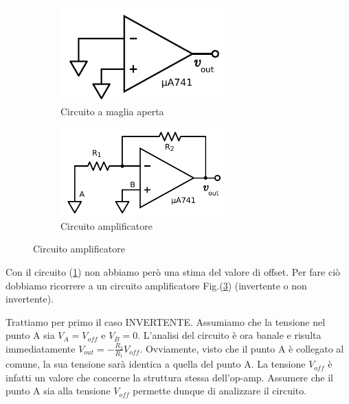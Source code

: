 \begin{figure}[ht]
        \centering
        \begin{subfigure}[b]{0.35\textwidth}
                 \includegraphics[width=0.70\textwidth]{../E02/latex/open_loop.pdf}
                \caption{Circuito a maglia aperta}
                \label{cir:open_loop}
        \end{subfigure}%
    \quad
        \begin{subfigure}[b]{0.35\textwidth}
               \includegraphics[width=0.70\textwidth]{../E02/latex/inv.pdf}
                \caption{Circuito amplificatore}
                \label{cir:inv}
        \end{subfigure}
     
\end{figure}





Con il circuito (\ref{cir:open_loop}) non abbiamo però una stima del valore di offset. Per fare ciò dobbiamo ricorrere a un circuito amplificatore Fig.(\ref{cir:inv}) (invertente o non invertente).




Trattiamo per primo il caso INVERTENTE. Assumiamo che la tensione nel punto A sia $V_A=V_{off}$ e $V_B=0$. L'analisi del circuito è ora banale e risulta immediatamente $V_{out}=-\frac{R_2}{R_1}V_{off}$. Ovviamente, visto che il punto A è collegato al comune, la sua tensione sarà identica a quella del punto A. La tensione $V_{off}$ è infatti un valore che concerne la struttura stessa dell'op-amp. Assumere che il punto A sia alla tensione $V_{off}$ permette dunque di analizzare il circuito. 

